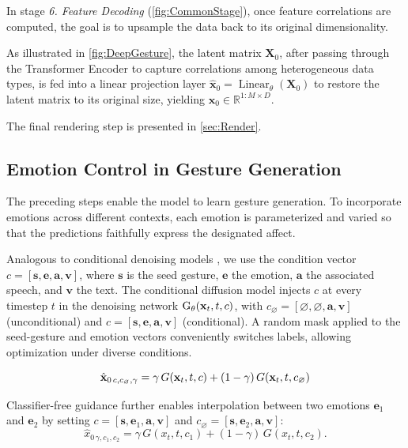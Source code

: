 In stage \textit{6. Feature Decoding} (\autoref{fig:CommonStage}), once feature correlations are computed, the goal is to upsample the data back to its original dimensionality.

As illustrated in \autoref{fig:DeepGesture}, the latent matrix $\mathbf{X}_{0}$, after passing through the Transformer Encoder to capture correlations among heterogeneous data types, is fed into a linear projection layer
$\hat{\mathbf{x}}_{0} = \operatorname{Linear}_{\theta}(\mathbf{X}_{0})$
to restore the latent matrix to its original size, yielding $\hat{\mathbf{x}}_{0} \in \mathbb{R}^{1:M \times D}$.

The final rendering step is presented in \autoref{sec:Render}.

\subsection{Emotion Control in Gesture Generation}

The preceding steps enable the model to learn gesture generation. To incorporate emotions across different contexts, each emotion is parameterized and varied so that the predictions faithfully express the designated affect.

Analogous to conditional denoising models \citep{ho2022classifier, tevet2022human}, we use the condition vector
$c = [\mathbf{s}, \mathbf{e}, \mathbf{a}, \mathbf{v}]$,  
where $\mathbf{s}$ is the seed gesture, $\mathbf{e}$ the emotion, $\mathbf{a}$ the associated speech, and $\mathbf{v}$ the text.
The conditional diffusion model injects $c$ at every timestep $t$ in the denoising network $\text{G}_\theta(\mathbf{x}_{t}, t, c)$, with
$c_{\varnothing} = [\varnothing, \varnothing, \mathbf{a}, \mathbf{v}]$ (unconditional)
and $c = [\mathbf{s}, \mathbf{e}, \mathbf{a}, \mathbf{v}]$ (conditional).
A random mask applied to the seed-gesture and emotion vectors conveniently switches labels, allowing optimization under diverse conditions.

\begin{equation} \label{eq:denoise}
	\hat{\mathbf{x}}_{0\,c,c_{\varnothing},\gamma}
	= \gamma\, G(\mathbf{x}_{t}, t, c) + (1-\gamma)\, G(\mathbf{x}_{t}, t, c_{\varnothing})
\end{equation}

Classifier-free guidance \citep{ho2022classifier} further enables interpolation between two emotions
$\mathbf{e}_1$ and $\mathbf{e}_2$ by setting
$c = [\mathbf{s}, \mathbf{e}_{1}, \mathbf{a}, \mathbf{v}]$ and
$c_{\varnothing} = [\mathbf{s}, \mathbf{e}_{2}, \mathbf{a}, \mathbf{v}]$:
\[
\hat{x}_{0\,\gamma, c_{1}, c_{2}}
= \gamma\, G(x_{t}, t, c_{1}) + (1-\gamma)\, G(x_{t}, t, c_{2}).
\]
